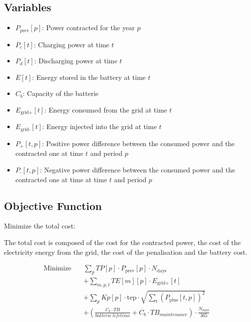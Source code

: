 \documentclass{article}
\begin{document}
\subsection*{Variables}
\begin{itemize}
    \item \( P_{\text{prev}}[p] \): Power contracted for the year \( p \)
    \item \( P_c[t] \): Charging power at time \( t \)
    \item \( P_d[t] \): Discharging power at time \( t \)
    \item \( E[t] \): Energy stored in the battery at time \( t \)
    \item \( C_b \): Capacity of the batterie
    \item \( E_{\text{grid+}}[t] \): Energy consumed from the grid at time \( t \)
    \item \( E_{\text{grid-}}[t] \): Energy injected into the grid at time \( t \)
    \item \( P_{\text{+}}[t, p] \): Positive power difference between the consumed power and the contracted one at time \( t \) and period \( p \)
    \item \( P_{\text{-}}[t, p] \): Negative power difference between the consumed power and the contracted one at time at time \( t \) and period \( p \)
\end{itemize}

\subsection*{Objective Function}
Minimize the total cost:

The total cost is composed of the cost for the contracted power, the cost of the electricity energy from the grid, the cost of the penalisation and the battery cost.

\[
\begin{aligned}
    \text{Minimize} \quad & \sum_{p} TP[p] \cdot P_{\text{prev}}[p] \cdot N_{\text{days}} \\
    & + \sum_{m, p, t} TE[m][p] \cdot E_{\text{grid+}}[t] \\
    & + \sum_{p} Kp[p] \cdot \text{tep} \cdot \sqrt{\sum_{t} (P_{\text{plus}}[t, p])^2} \\
    & + \left( \frac{C_b \cdot TB}{batterie\ lifetime} + C_b \cdot TB_{maintenance} \right) \cdot \frac{N_{\text{days}}}{365}
\end{aligned}
\]
\end{document}
